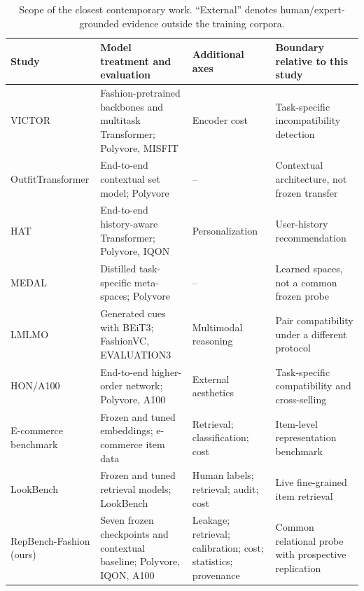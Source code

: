 \documentclass[pdflatex,sn-mathphys-num,iicol]{sn-jnl}
\begin{document}
\begin{table}[t]
\caption{Scope of the closest contemporary work. ``External'' denotes human/expert-grounded evidence outside the training corpora.}
\label{tab:closest}
\centering\small{}
\setlength{\tabcolsep}{4pt}\renewcommand{\arraystretch}{1.12}
\begin{tabularx}{\textwidth}{@{}>{\raggedright\arraybackslash}p{}>{\raggedright\arraybackslash}p{}>{\raggedright\arraybackslash}p{}>{\raggedright\arraybackslash}X@{}}
\toprule
Study & Model treatment and evaluation & Additional axes & Boundary relative to this study \\
\midrule
VICTOR \cite{papadopoulos2023victor} & Fashion-pretrained backbones and multitask Transformer; Polyvore, MISFIT & Encoder cost & Task-specific incompatibility detection \\
OutfitTransformer \cite{sarkar2023outfittransformer} & End-to-end contextual set model; Polyvore & -- & Contextual architecture, not frozen transfer \\
HAT \cite{jung2025hat} & End-to-end history-aware Transformer; Polyvore, IQON & Personalization & User-history recommendation \\
MEDAL \cite{sanny2026medal} & Distilled task-specific meta-spaces; Polyvore & -- & Learned spaces, not a common frozen probe \\
LMLMO \cite{chang2025large} & Generated cues with BEiT3; FashionVC, EVALUATION3 & Multimodal reasoning & Pair compatibility under a different protocol \\
HON/A100 \cite{pang2026crossselling} & End-to-end higher-order network; Polyvore, A100 & External aesthetics & Task-specific compatibility and cross-selling \\
E-commerce benchmark \cite{czerwinska2025ecommerce} & Frozen and tuned embeddings; e-commerce item data & Retrieval; classification; cost & Item-level representation benchmark \\
LookBench \cite{gao2026lookbench} & Frozen and tuned retrieval models; LookBench & Human labels; retrieval; audit; cost & Live fine-grained item retrieval \\
RepBench-Fashion (ours) & Seven frozen checkpoints and contextual baseline; Polyvore, IQON, A100 & Leakage; retrieval; calibration; cost; statistics; provenance & Common relational probe with prospective replication \\
\bottomrule
\end{tabularx}
\end{table}
\end{document}
